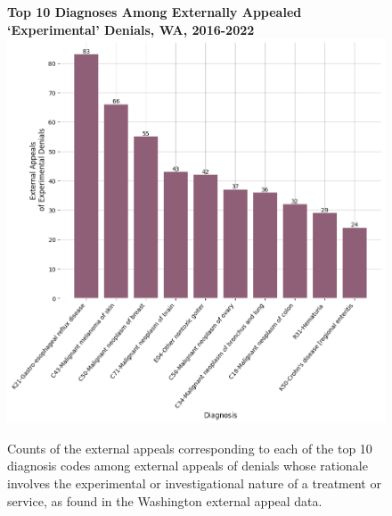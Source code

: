 \documentclass[12pt, a4paper,twoside,parskip=full]{report}
\theoremstyle{plain} %
\theoremstyle{definition} %
\theoremstyle{remark} %
\numberwithin{equation}{chapter}
\begin{document}
		\begin{figure}[h!]
			\centering
			\textbf{Top 10 Diagnoses Among Externally Appealed `Experimental' Denials, WA, 2016-2022}
			\includegraphics[width=.8\textwidth]{images/wa_external_appeals/top_experimental_appeal_diagnoses.png}
			\caption{Counts of the external appeals corresponding to each of the top 10 diagnosis codes among external appeals of denials whose rationale involves the experimental or investigational nature of a treatment or service, as found in the Washington external appeal data.}
			\label{waexpexternalappealsbydiagnosis}
		\end{figure}
	\clearpage
	
\end{document}
